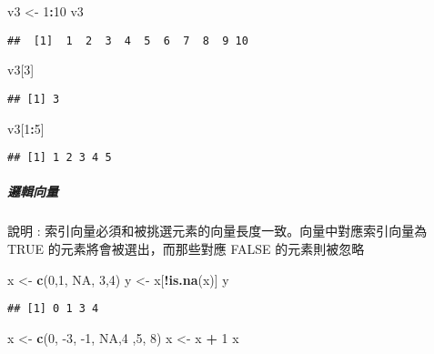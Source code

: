 \documentclass[
]{article}
\newenvironment{Shaded}{\begin{snugshade}}{\end{snugshade}}
\newcommand{\DecValTok}[1]{\textcolor[rgb]{0.00,0.00,0.81}{#1}}
\newcommand{\KeywordTok}[1]{\textcolor[rgb]{0.13,0.29,0.53}{\textbf{#1}}}
\newcommand{\NormalTok}[1]{#1}
\newcommand{\OperatorTok}[1]{\textcolor[rgb]{0.81,0.36,0.00}{\textbf{#1}}}
\newcommand{\OtherTok}[1]{\textcolor[rgb]{0.56,0.35,0.01}{#1}}
\newcommand{\StringTok}[1]{\textcolor[rgb]{0.31,0.60,0.02}{#1}}
\begin{document}
\begin{Shaded}
\begin{Highlighting}[]
\NormalTok{v3 <-}\StringTok{ }\DecValTok{1}\OperatorTok{:}\DecValTok{10}
\NormalTok{v3}
\end{Highlighting}
\end{Shaded}

\begin{verbatim}
##  [1]  1  2  3  4  5  6  7  8  9 10
\end{verbatim}

\begin{Shaded}
\begin{Highlighting}[]
\NormalTok{v3[}\DecValTok{3}\NormalTok{]}
\end{Highlighting}
\end{Shaded}

\begin{verbatim}
## [1] 3
\end{verbatim}

\begin{Shaded}
\begin{Highlighting}[]
\NormalTok{v3[}\DecValTok{1}\OperatorTok{:}\DecValTok{5}\NormalTok{]}
\end{Highlighting}
\end{Shaded}

\begin{verbatim}
## [1] 1 2 3 4 5
\end{verbatim}

\hypertarget{ux908fux8f2fux5411ux91cf}{%
\subparagraph{邏輯向量}\label{ux908fux8f2fux5411ux91cf}}

說明 : 索引向量必須和被挑選元素的向量長度一致。向量中對應索引向量為 TRUE
的元素將會被選出，而那些對應 FALSE 的元素則被忽略

\begin{Shaded}
\begin{Highlighting}[]
\NormalTok{x <-}\StringTok{ }\KeywordTok{c}\NormalTok{(}\DecValTok{0}\NormalTok{,}\DecValTok{1}\NormalTok{, }\OtherTok{NA}\NormalTok{, }\DecValTok{3}\NormalTok{,}\DecValTok{4}\NormalTok{)}
\NormalTok{y <-}\StringTok{ }\NormalTok{x[}\OperatorTok{!}\KeywordTok{is.na}\NormalTok{(x)]}
\NormalTok{y}
\end{Highlighting}
\end{Shaded}

\begin{verbatim}
## [1] 0 1 3 4
\end{verbatim}

\begin{Shaded}
\begin{Highlighting}[]
\NormalTok{x <-}\StringTok{ }\KeywordTok{c}\NormalTok{(}\DecValTok{0}\NormalTok{, }\DecValTok{-3}\NormalTok{, }\DecValTok{-1}\NormalTok{, }\OtherTok{NA}\NormalTok{,}\DecValTok{4}\NormalTok{ ,}\DecValTok{5}\NormalTok{, }\DecValTok{8}\NormalTok{)}
\NormalTok{x <-}\StringTok{ }\NormalTok{x }\OperatorTok{+}\StringTok{ }\DecValTok{1}
\NormalTok{x}
\end{Highlighting}
\end{Shaded}
\end{document}
